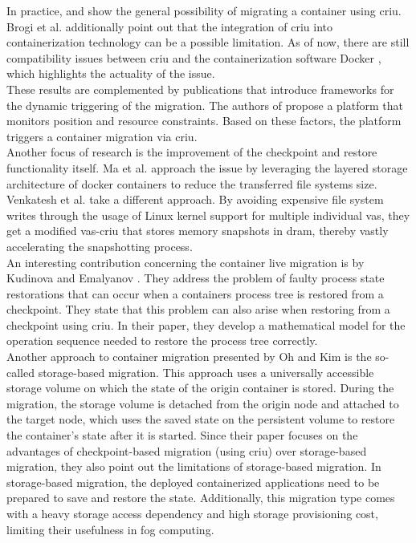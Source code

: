 In practice, \cite{Brogi.2018} and \cite{Oh.2018} show the general possibility of migrating a container using \gls{criu}. Brogi et al. \cite{Brogi.2018} additionally point out that the integration of \gls{criu} into containerization technology can be a possible limitation. As of now, there are still compatibility issues between \gls{criu} and the containerization software Docker \cite{.27032020}, which highlights the actuality of the issue.\\
These results are complemented by publications that introduce frameworks for the dynamic triggering of the migration. The authors of \cite{Puliafito.2018} propose a platform that monitors position and resource constraints. Based on these factors, the platform triggers a container migration via \gls{criu}.\\
Another focus of research is the improvement of the checkpoint and restore functionality itself. Ma et al. \cite{Ma.2019} approach the issue by leveraging the layered storage architecture of docker containers to reduce the transferred file systems size. Venkatesh et al. \cite{Venkatesh.2019} take a different approach. By avoiding expensive file system writes through the usage of Linux kernel support for multiple individual \gls{vas}, they get a modified \gls{vas}-\gls{criu} that stores memory snapshots in \gls{dram}, thereby vastly accelerating the snapshotting process.\\



An interesting contribution concerning the container live migration is by Kudinova and Emalyanov \cite{Kudinova.2017}. They address the problem of faulty process state restorations that can occur when a containers process tree is restored from a checkpoint. They state that this problem can also arise when restoring from a checkpoint using \gls{criu}. In their paper, they develop a mathematical model for the operation sequence needed to restore the process tree correctly.\\
Another approach to container migration presented by Oh and Kim \cite{Oh.2018} is the so-called storage-based migration. This approach uses a universally accessible storage volume on which the state of the origin container is stored. During the migration, the storage volume is detached from the origin node and attached to the target node, which uses the saved state on the persistent volume to restore the container's state after it is started. Since their paper focuses on the advantages of checkpoint-based migration (using \gls{criu}) over storage-based migration, they also point out the limitations of storage-based migration. In storage-based migration, the deployed containerized applications need to be prepared to save and restore the state. Additionally, this migration type comes with a heavy storage access dependency and high storage provisioning cost, limiting their usefulness in fog computing.


